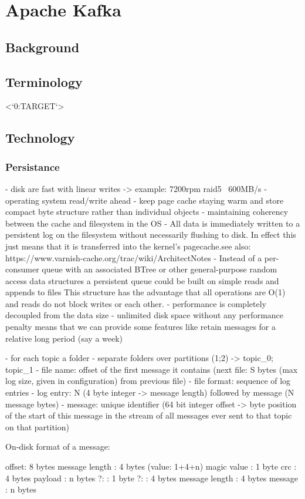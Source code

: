 \chapter{Apache Kafka}
\section{Background}

\section{Terminology}
<`0:TARGET`>

\section{Technology}

\subsection{Persistance}
- disk are fast with linear writes -> example: 7200rpm raid5 ~600MB/s
- operating system read/write ahead
- keep page cache staying warm and store compact byte structure rather than individual objects
- maintaining coherency between the cache and filesystem in the OS
- All data is immediately written to a persistent log on the filesystem without necessarily flushing to disk. In effect this just means that it is transferred into the kernel's pagecache.see also: https://www.varnish-cache.org/trac/wiki/ArchitectNotes
- Instead of  a per-consumer queue with an associated BTree or other general-purpose random access data structures
  a persistent queue could be built on simple reads and appends to files
  This structure has the advantage that all operations are O(1) and reads do not block writes or each other.
- performance is completely decoupled from the data size
- unlimited disk space without any performance penalty means that we can provide some features like retain messages for a relative long period (say a week)



- for each topic a folder
- separate folders over partitions (1;2) -> topic\_0; topic\_1
- file name: offset of the first message it contains (next file: S bytes (max log size, given in configuration) from previous file)
- file format: sequence of log entries
- log entry: N (4 byte integer -> message length) followed by message (N message bytes)
- message: unique identifier (64 bit integer offset -> byte position of the start of this message in the stream of all messages ever sent to that topic on that partition)

On-disk format of a message:

offset: 8 bytes
message length : 4 bytes (value: 1+4+n) 
magic value  : 1 byte
crc            : 4 bytes
payload        : n bytes
    ?:              : 1 byte
    ?:              : 4 bytes
    message length  : 4 bytes
    message         : n bytes

